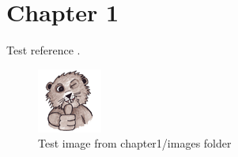 \chapter{Chapter 1}

Test reference \cite{thesistpl}.

\begin{figure}[H]
	\begin{center}
		\includegraphics{content/chapter1/images/beaver}
		\caption{Test image from chapter1/images folder}
	\end{center}
\end{figure}
